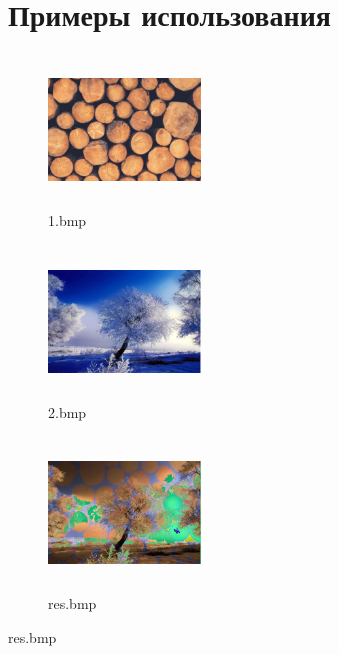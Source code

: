 \documentclass{article}
\begin{document}
\begin{figure}[H]
\section{Примеры использования}
\begin{subfigure}[t]{0.325\linewidth}
\includegraphics[width=115pt,height=115pt]{1.jpg}
\caption{1.bmp}
\end{subfigure}
\begin{subfigure}[t]{0.325\linewidth}
\includegraphics[width=115pt,height=115pt]{2.jpg}
\caption{2.bmp}
\end{subfigure}
\begin{subfigure}[t]{0.325\linewidth}
\includegraphics[width=115pt,height=115pt]{res.jpg}
\caption{res.bmp}
\end{subfigure}
\end{figure}

  
\end{document}
